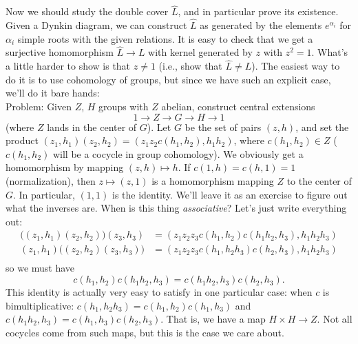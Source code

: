  Now we should study the double cover $\hat L$, and in particular prove its existence.
 Given a Dynkin diagram, we can construct $\hat L$ as generated by the elements
 $e^{\alpha_i}$ for $\alpha_i$ simple roots with the given relations. It is easy to
 check that we get a surjective homomorphism $\hat L \to L$ with kernel
 generated by $z$ with $z^2=1$.  What's a little harder to show is that
 $z\neq 1$ (i.e., show that $\hat L\neq L$).
 The easiest way to do it is to use cohomology of groups, but since we have such an
 explicit case, we'll do it bare hands:\\
 Problem: Given $Z$, $H$ groups with $Z$ abelian, construct central extensions
 \[
    1\to Z\to G\to H\to 1
 \]
 (where $Z$ lands in the center of $G$). Let $G$ be the set of pairs $(z,h)$, and set
 the product $(z_1,h_1)(z_2,h_2) = (z_1z_2 c(h_1,h_2),h_1h_2)$, where $c(h_1,h_2)\in
 Z$ ($c(h_1,h_2)$ will be a cocycle in group cohomology). We obviously get a
 homomorphism by mapping $(z,h)\mapsto h$. If $c(1,h)=c(h,1)=1$ (normalization), then
 $z\mapsto (z,1)$ is a homomorphism mapping $Z$ to the center of $G$. In particular,
 $(1,1)$ is the identity. We'll leave it as an exercise to figure out what
 the inverses are. When is this thing \emph{associative}?
 Let's just write everything out:
 \begin{align*}
   \big( (z_1,h_1)(z_2,h_2)\big)(z_3,h_3) &= (z_1z_2z_3 c(h_1,h_2)c(h_1h_2,h_3),
   h_1h_2h_3)\\
   (z_1,h_1)\big( (z_2,h_2)(z_3,h_3)\big) &= (z_1z_2z_3 c(h_1,h_2h_3)c(h_2,h_3),
   h_1h_2h_3)\\
 \end{align*}
 so we must have
 \[
    c(h_1,h_2)c(h_1h_2,h_3) = c(h_1h_2,h_3)c(h_2,h_3).
 \]
 This identity is actually very easy to satisfy in one particular case: when $c$ is
 bimultiplicative: $c(h_1,h_2h_3)=c(h_1,h_2)c(h_1,h_3)$ and
 $c(h_1h_2,h_3)=c(h_1,h_3)c(h_2,h_3)$. That is, we have a map $H\times H\to Z$. Not
 all cocycles come from such maps, but this is the case we care about.

